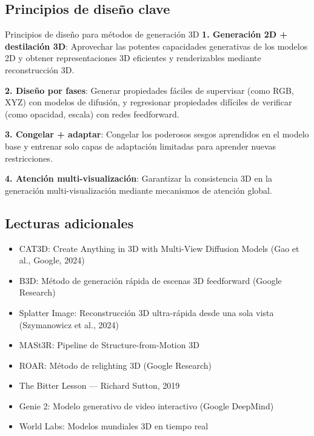 \documentclass[a4paper]{article}
\begin{document}
\subsection{Principios de diseño clave}

\begin{importantbox}{Principios de diseño para métodos de generación 3D}
\textbf{1. Generación 2D + destilación 3D}: Aprovechar las potentes capacidades generativas de los modelos 2D y obtener representaciones 3D eficientes y renderizables mediante reconstrucción 3D.

\textbf{2. Diseño por fases}: Generar propiedades fáciles de supervisar (como RGB, XYZ) con modelos de difusión, y regresionar propiedades difíciles de verificar (como opacidad, escala) con redes feedforward.

\textbf{3. Congelar + adaptar}: Congelar los poderosos sesgos aprendidos en el modelo base y entrenar solo capas de adaptación limitadas para aprender nuevas restricciones.

\textbf{4. Atención multi-visualización}: Garantizar la consistencia 3D en la generación multi-visualización mediante mecanismos de atención global.
\end{importantbox}

\subsection{Lecturas adicionales}

\begin{itemize}
    \item CAT3D: Create Anything in 3D with Multi-View Diffusion Models (Gao et al., Google, 2024)
    \item B3D: Método de generación rápida de escenas 3D feedforward (Google Research)
    \item Splatter Image: Reconstrucción 3D ultra-rápida desde una sola vista (Szymanowicz et al., 2024)
    \item MASt3R: Pipeline de Structure-from-Motion 3D
    \item ROAR: Método de relighting 3D (Google Research)
    \item The Bitter Lesson --- Richard Sutton, 2019
    \item Genie 2: Modelo generativo de video interactivo (Google DeepMind)
    \item World Labs: Modelos mundiales 3D en tiempo real
\end{itemize}

\end{document}
